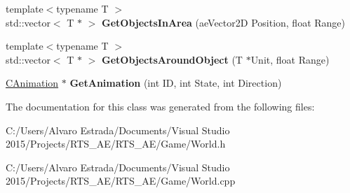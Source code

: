 \begin{DoxyCompactItemize}
\item 
{\footnotesize template$<$typename T $>$ }\\std\+::vector$<$ T $\ast$ $>$ {\bfseries Get\+Objects\+In\+Area} (ae\+Vector2D Position, float Range)\hypertarget{class_c_world_a307b8b96177858cde97042979acee3cf}{}\label{class_c_world_a307b8b96177858cde97042979acee3cf}

\item 
{\footnotesize template$<$typename T $>$ }\\std\+::vector$<$ T $\ast$ $>$ {\bfseries Get\+Objects\+Around\+Object} (T $\ast$Unit, float Range)\hypertarget{class_c_world_af478841eb1218d123a3e75647b19f636}{}\label{class_c_world_af478841eb1218d123a3e75647b19f636}

\item 
\hyperlink{class_c_animation}{C\+Animation} $\ast$ {\bfseries Get\+Animation} (int ID, int State, int Direction)\hypertarget{class_c_world_a665563427ed6d36c060125fa76d278e8}{}\label{class_c_world_a665563427ed6d36c060125fa76d278e8}

\end{DoxyCompactItemize}


The documentation for this class was generated from the following files\+:\begin{DoxyCompactItemize}
\item 
C\+:/\+Users/\+Alvaro Estrada/\+Documents/\+Visual Studio 2015/\+Projects/\+R\+T\+S\+\_\+\+A\+E/\+R\+T\+S\+\_\+\+A\+E/\+Game/World.\+h\item 
C\+:/\+Users/\+Alvaro Estrada/\+Documents/\+Visual Studio 2015/\+Projects/\+R\+T\+S\+\_\+\+A\+E/\+R\+T\+S\+\_\+\+A\+E/\+Game/World.\+cpp\end{DoxyCompactItemize}

